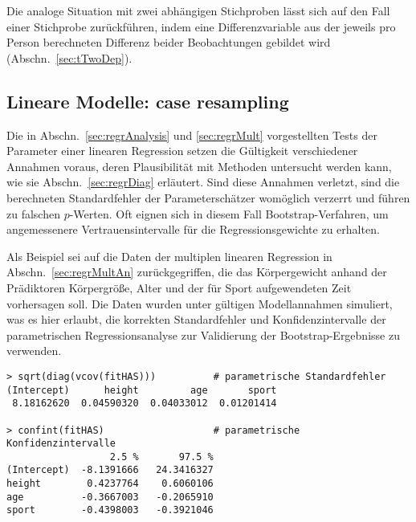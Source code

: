 Die analoge Situation mit zwei abhängigen Stichproben lässt sich auf den Fall einer Stichprobe zurückführen, indem eine Differenzvariable aus der jeweils pro Person berechneten Differenz beider Beobachtungen gebildet wird (Abschn.\ \ref{sec:tTwoDep}).

\subsection{Lineare Modelle: case resampling}
\label{sec:bootRegr}


Die in Abschn.\ \ref{sec:regrAnalysis} und \ref{sec:regrMult} vorgestellten Tests der Parameter einer linearen Regression setzen die Gültigkeit verschiedener Annahmen voraus, deren Plausibilität mit Methoden untersucht werden kann, wie sie Abschn.\ \ref{sec:regrDiag} erläutert. Sind diese Annahmen verletzt, sind die berechneten Standardfehler der Parameterschätzer womöglich verzerrt und führen zu falschen $p$-Werten. Oft eignen sich in diesem Fall Bootstrap-Verfahren, um angemessenere Vertrauensintervalle für die Regressionsgewichte zu erhalten.

Als Beispiel sei auf die Daten der multiplen linearen Regression in Abschn.\ \ref{sec:regrMultAn} zurückgegriffen, die das Körpergewicht anhand der Prädiktoren Körpergröße, Alter und der für Sport aufgewendeten Zeit vorhersagen soll. Die Daten wurden unter gültigen Modellannahmen simuliert, was es hier erlaubt, die korrekten Standardfehler und Konfidenzintervalle der parametrischen Regressionsanalyse zur Validierung der Bootstrap-Ergebnisse zu verwenden.
\begin{lstlisting}
> sqrt(diag(vcov(fitHAS)))          # parametrische Standardfehler
(Intercept)      height         age       sport
 8.18162620  0.04590320  0.04033012  0.01201414

> confint(fitHAS)                   # parametrische Konfidenzintervalle
                  2.5 %       97.5 %
(Intercept)  -8.1391666   24.3416327
height        0.4237764    0.6060106
age          -0.3667003   -0.2065910
sport        -0.4398003   -0.3921046
\end{lstlisting}


